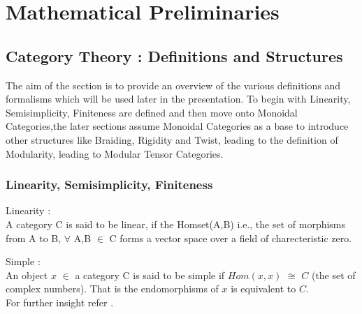 
\chapter{Mathematical Preliminaries} %

\label{Chapter1} %



\section{Category Theory : Definitions and Structures}
 The aim of the section is to provide an overview of the various definitions and formalisms which will be used later in the presentation.
To begin with Linearity, Semisimplicity, Finiteness are defined and then move onto Monoidal Categories,the later sections  
assume Monoidal Categories as a base to introduce other structures like Braiding, Rigidity and Twist, leading to 
the definition of Modularity, leading to Modular Tensor Categories. 


\subsection{Linearity, Semisimplicity, Finiteness}

\begin{defn}
Linearity :\\
          A category C is said to be linear, if the Homset(A,B) i.e., the set of morphisms from A to B, $\forall$ A,B $\in$ C forms a vector space over a field of charecteristic zero.
\end{defn}

\begin{defn}
Simple  :\\ 
	An object $x$ $\in$ a category C is said to be simple if $Hom(x,x)$ $\cong$ $C$ (the set of complex numbers). That is the endomorphisms of $x$ is equivalent to $C$. \\
	For further insight refer \citep{Reference15}.
\end{defn}

